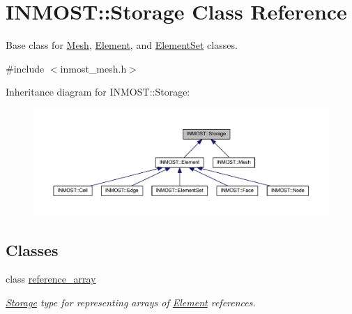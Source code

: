 \hypertarget{classINMOST_1_1Storage}{\section{I\-N\-M\-O\-S\-T\-:\-:Storage Class Reference}
\label{classINMOST_1_1Storage}
}


Base class for \hyperlink{classINMOST_1_1Mesh}{Mesh}, \hyperlink{classINMOST_1_1Element}{Element}, and \hyperlink{classINMOST_1_1ElementSet}{Element\-Set} classes.  




{\ttfamily \#include $<$inmost\-\_\-mesh.\-h$>$}



Inheritance diagram for I\-N\-M\-O\-S\-T\-:\-:Storage\-:
\nopagebreak
\begin{figure}[H]
\begin{center}
\leavevmode
\includegraphics[width=350pt]{classINMOST_1_1Storage__inherit__graph}
\end{center}
\end{figure}
\subsection*{Classes}
\begin{DoxyCompactItemize}
\item 
class \hyperlink{classINMOST_1_1Storage_1_1reference__array}{reference\-\_\-array}
\begin{DoxyCompactList}\small\item\em \hyperlink{classINMOST_1_1Storage}{Storage} type for representing arrays of \hyperlink{classINMOST_1_1Element}{Element} references. \end{DoxyCompactList}\end{DoxyCompactItemize}
